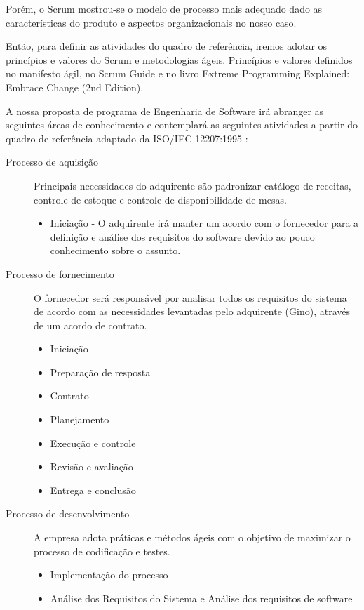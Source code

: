 Porém, o Scrum mostrou-se o modelo de processo mais adequado dado as características do produto e aspectos organizacionais no nosso caso. 

Então, para definir as atividades do quadro de referência, iremos adotar os princípios e valores do Scrum e metodologias ágeis. Princípios e valores definidos no manifesto ágil\cite{beck2001agile}, no Scrum Guide\cite{Schw01a} e no livro Extreme Programming Explained: Embrace Change (2nd Edition)\cite{BecAnd04extreme}.

A nossa proposta de programa de Engenharia de Software irá abranger as seguintes áreas de conhecimento e contemplará as seguintes atividades a partir do quadro de referência adaptado da ISO/IEC 12207:1995 \cite{iso12207:95}:

\begin{description}
  \item [Processo de aquisição] Principais necessidades do adquirente são padronizar catálogo de receitas, controle de estoque e controle de disponibilidade de mesas.
  \begin{itemize}
    \item Iniciação - O adquirente irá manter um acordo com o fornecedor para a definição e análise dos requisitos do software devido ao pouco conhecimento sobre o assunto.
  \end{itemize}
  \item [Processo de fornecimento] O fornecedor será responsável por analisar todos os requisitos do sistema de acordo com as necessidades levantadas pelo adquirente (Gino), através de um acordo de contrato.
  \begin{itemize}
    \item Iniciação
    \item Preparação de resposta
    \item Contrato
    \item Planejamento
    \item Execução e controle
    \item Revisão e avaliação
    \item Entrega e conclusão
  \end{itemize}
  \item [Processo de desenvolvimento] A empresa adota práticas e métodos ágeis com o objetivo de maximizar o processo de codificação e testes.
  \begin{itemize}
    \item Implementação do processo
    \item Análise dos Requisitos do Sistema e Análise dos requisitos de software

\end{itemize}
\end{description}
